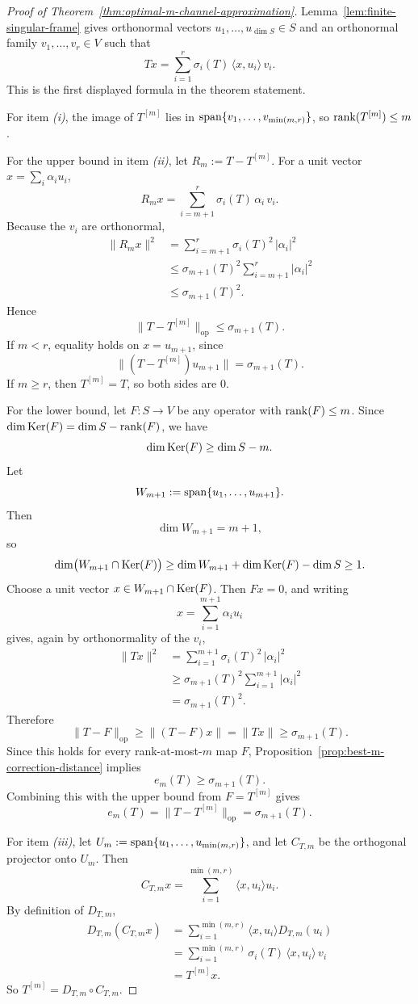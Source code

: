 \begin{proof}[Proof of Theorem~\ref{thm:optimal-m-channel-approximation}]
\label{proof:thm:optimal-m-channel-approximation}
Lemma~\ref{lem:finite-singular-frame} gives orthonormal vectors
\(u_1,\dots,u_{\dim S}\in S\) and an orthonormal family
\(v_1,\dots,v_r\in V\) such that
\[
Tx=\sum_{i=1}^{r}\sigma_i(T)\,\langle x,u_i\rangle\,v_i.
\]
This is the first displayed formula in the theorem statement.

For item \emph{(i)}, the image of \(T^{[m]}\) lies in
\(\mathrm{span}\{v_1,\dots,v_{\min(m,r)}\}\), so \(\mathrm{rank}(T^{[m]})\le m\).

For the upper bound in item \emph{(ii)}, let \(R_m:=T-T^{[m]}\). For a unit
vector \(x=\sum_i \alpha_i u_i\),
\[
R_mx=\sum_{i=m+1}^{r}\sigma_i(T)\,\alpha_i\,v_i.
\]
Because the \(v_i\) are orthonormal,
\begin{align*}
\|R_mx\|^2
&=
\sum_{i=m+1}^{r}\sigma_i(T)^2\,|\alpha_i|^2 \\
&\le
\sigma_{m+1}(T)^2\sum_{i=m+1}^{r}|\alpha_i|^2 \\
&\le \sigma_{m+1}(T)^2.
\end{align*}
Hence
\[
\|T-T^{[m]}\|_{\mathrm{op}}\le \sigma_{m+1}(T).
\]
If \(m<r\), equality holds on \(x=u_{m+1}\), since
\[
\|(T-T^{[m]})u_{m+1}\|=\sigma_{m+1}(T).
\]
If \(m\ge r\), then \(T^{[m]}=T\), so both sides are \(0\).

For the lower bound, let \(F:S\to V\) be any operator with \(\mathrm{rank}(F)\le m\).
Since \(\dim\mathrm{Ker}(F)=\dim S-\mathrm{rank}(F)\), we have
\[
\dim\mathrm{Ker}(F)\ge \dim S-m.
\]
Let
\[
W_{m+1}:=\mathrm{span}\{u_1,\dots,u_{m+1}\}.
\]
Then
\[
\dim W_{m+1}=m+1,
\]
so
\[
\dim\bigl(W_{m+1}\cap \mathrm{Ker}(F)\bigr)
\ge
\dim W_{m+1}+\dim\mathrm{Ker}(F)-\dim S
\ge 1.
\]
Choose a unit vector \(x\in W_{m+1}\cap \mathrm{Ker}(F)\). Then \(Fx=0\), and writing
\[
x=\sum_{i=1}^{m+1}\alpha_i u_i
\]
gives, again by orthonormality of the \(v_i\),
\begin{align*}
\|Tx\|^2
&=
\sum_{i=1}^{m+1}\sigma_i(T)^2\,|\alpha_i|^2 \\
&\ge
\sigma_{m+1}(T)^2 \sum_{i=1}^{m+1}|\alpha_i|^2 \\
&=
\sigma_{m+1}(T)^2.
\end{align*}
Therefore
\[
\|T-F\|_{\mathrm{op}}
\ge
\|(T-F)x\|
=
\|Tx\|
\ge
\sigma_{m+1}(T).
\]
Since this holds for every rank-at-most-\(m\) map \(F\), Proposition~\ref{prop:best-m-correction-distance}
implies
\[
e_m(T)\ge \sigma_{m+1}(T).
\]
Combining this with the upper bound from \(F=T^{[m]}\) gives
\[
e_m(T)=\|T-T^{[m]}\|_{\mathrm{op}}=\sigma_{m+1}(T).
\]

For item \emph{(iii)}, let \(U_m:=\mathrm{span}\{u_1,\dots,u_{\min(m,r)}\}\), and let
\(C_{T,m}\) be the orthogonal projector onto \(U_m\). Then
\[
C_{T,m}x=\sum_{i=1}^{\min(m,r)}\langle x,u_i\rangle u_i.
\]
By definition of \(D_{T,m}\),
\begin{align*}
D_{T,m}(C_{T,m}x)
&=
\sum_{i=1}^{\min(m,r)}\langle x,u_i\rangle D_{T,m}(u_i) \\
&=
\sum_{i=1}^{\min(m,r)}\sigma_i(T)\,\langle x,u_i\rangle\,v_i \\
&=
T^{[m]}x.
\end{align*}
So \(T^{[m]}=D_{T,m}\circ C_{T,m}\).
\end{proof}

